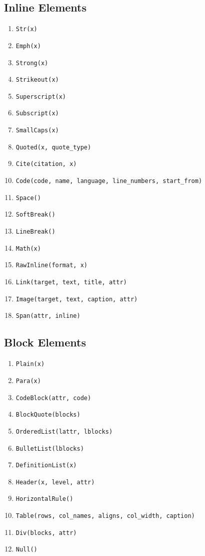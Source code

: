 \documentclass[a4paper]{article}\usepackage[]{graphicx}\usepackage[]{color}
\newcommand{\code}[1]{\texttt{#1}}
\begin{document}
\subsection{Inline Elements}
\begin{enumerate}
    \item \code{Str(x)}
    \item \code{Emph(x)}
    \item \code{Strong(x)}
    \item \code{Strikeout(x)}
    \item \code{Superscript(x)}
    \item \code{Subscript(x)}
    \item \code{SmallCaps(x)}
    \item \code{Quoted(x, quote\_type)}
    \item \code{Cite(citation, x)}
    \item \code{Code(code, name, language, line\_numbers, start\_from)}
    \item \code{Space()}
    \item \code{SoftBreak()}
    \item \code{LineBreak()}
    \item \code{Math(x)}
    \item \code{RawInline(format, x)}
    \item \code{Link(target, text, title, attr)}
    \item \code{Image(target, text, caption, attr)}
    \item \code{Span(attr, inline)}
\end{enumerate}

\subsection{Block Elements}
\begin{enumerate}
    \item \code{Plain(x)}
    \item \code{Para(x)}
    \item \code{CodeBlock(attr, code)}
    \item \code{BlockQuote(blocks)}
    \item \code{OrderedList(lattr, lblocks)}
    \item \code{BulletList(lblocks)}
    \item \code{DefinitionList(x)}
    \item \code{Header(x, level, attr)}
    \item \code{HorizontalRule()}
    \item \code{Table(rows, col\_names, aligns, col\_width, caption)}
    \item \code{Div(blocks, attr)}
    \item \code{Null()}
\end{enumerate}
\end{document}
